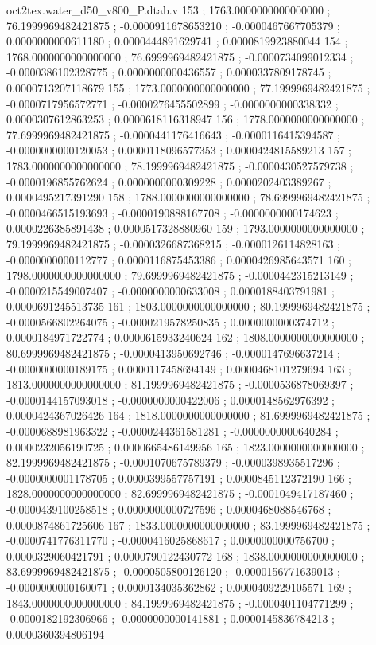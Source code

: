 \begin{filecontents}[overwrite]{oct2tex.water_d50_v800_P.dtab.v}
153 ; 1763.0000000000000000 ; 76.1999969482421875 ; -0.0000911678653210 ; -0.0000467667705379 ; 0.0000000000611180 ; 0.0000444891629741 ; 0.0000819923880044
154 ; 1768.0000000000000000 ; 76.6999969482421875 ; -0.0000734099012334 ; -0.0000386102328775 ; 0.0000000000436557 ; 0.0000337809178745 ; 0.0000713207118679
155 ; 1773.0000000000000000 ; 77.1999969482421875 ; -0.0000717956572771 ; -0.0000276455502899 ; -0.0000000000338332 ; 0.0000307612863253 ; 0.0000618116318947
156 ; 1778.0000000000000000 ; 77.6999969482421875 ; -0.0000441176416643 ; -0.0000116415394587 ; -0.0000000000120053 ; 0.0000118096577353 ; 0.0000424815589213
157 ; 1783.0000000000000000 ; 78.1999969482421875 ; -0.0000430527579738 ; -0.0000196855762624 ; 0.0000000000309228 ; 0.0000202403389267 ; 0.0000495217391290
158 ; 1788.0000000000000000 ; 78.6999969482421875 ; -0.0000466515193693 ; -0.0000190888167708 ; -0.0000000000174623 ; 0.0000226385891438 ; 0.0000517328880960
159 ; 1793.0000000000000000 ; 79.1999969482421875 ; -0.0000326687368215 ; -0.0000126114828163 ; -0.0000000000112777 ; 0.0000116875453386 ; 0.0000426985643571
160 ; 1798.0000000000000000 ; 79.6999969482421875 ; -0.0000442315213149 ; -0.0000215549007407 ; -0.0000000000633008 ; 0.0000188403791981 ; 0.0000691245513735
161 ; 1803.0000000000000000 ; 80.1999969482421875 ; -0.0000566802264075 ; -0.0000219578250835 ; 0.0000000000374712 ; 0.0000184971722774 ; 0.0000615933240624
162 ; 1808.0000000000000000 ; 80.6999969482421875 ; -0.0000413950692746 ; -0.0000147696637214 ; -0.0000000000189175 ; 0.0000117458694149 ; 0.0000468101279694
163 ; 1813.0000000000000000 ; 81.1999969482421875 ; -0.0000536878069397 ; -0.0000144157093018 ; -0.0000000000422006 ; 0.0000148562976392 ; 0.0000424367026426
164 ; 1818.0000000000000000 ; 81.6999969482421875 ; -0.0000688981963322 ; -0.0000244361581281 ; -0.0000000000640284 ; 0.0000232056190725 ; 0.0000665486149956
165 ; 1823.0000000000000000 ; 82.1999969482421875 ; -0.0001070675789379 ; -0.0000398935517296 ; -0.0000000001178705 ; 0.0000399557757191 ; 0.0000845112372190
166 ; 1828.0000000000000000 ; 82.6999969482421875 ; -0.0001049417187460 ; -0.0000439100258518 ; 0.0000000000727596 ; 0.0000468088546768 ; 0.0000874861725606
167 ; 1833.0000000000000000 ; 83.1999969482421875 ; -0.0000741776311770 ; -0.0000416025868617 ; 0.0000000000756700 ; 0.0000329060421791 ; 0.0000790122430772
168 ; 1838.0000000000000000 ; 83.6999969482421875 ; -0.0000505800126120 ; -0.0000156771639013 ; -0.0000000000160071 ; 0.0000134035362862 ; 0.0000409229105571
169 ; 1843.0000000000000000 ; 84.1999969482421875 ; -0.0000401104771299 ; -0.0000182192306966 ; -0.0000000000141881 ; 0.0000145836784213 ; 0.0000360394806194

\end{filecontents}
